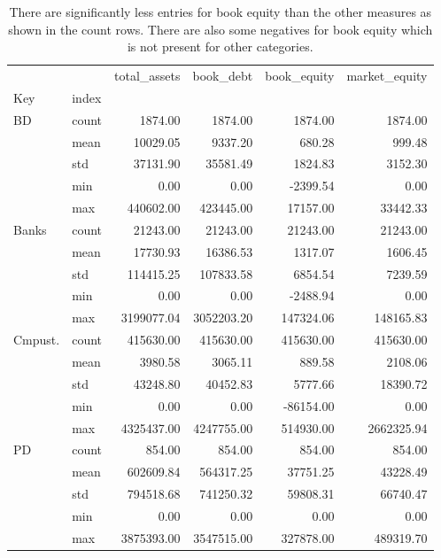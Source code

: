 \begin{table}
\caption{There are significantly less entries for book equity than the other measures as shown in the count rows. There are also some negatives for book equity which is not present for other categories. }
\label{tab:Table 2.1}
\begin{tabular}{llrrrr}
\toprule
 &  & total_assets & book_debt & book_equity & market_equity \\
Key & index &  &  &  &  \\
\midrule
{BD} & count & 1874.00 & 1874.00 & 1874.00 & 1874.00 \\
 & mean & 10029.05 & 9337.20 & 680.28 & 999.48 \\
 & std & 37131.90 & 35581.49 & 1824.83 & 3152.30 \\
 & min & 0.00 & 0.00 & -2399.54 & 0.00 \\
 & max & 440602.00 & 423445.00 & 17157.00 & 33442.33 \\
\cline{1-6}
{Banks} & count & 21243.00 & 21243.00 & 21243.00 & 21243.00 \\
 & mean & 17730.93 & 16386.53 & 1317.07 & 1606.45 \\
 & std & 114415.25 & 107833.58 & 6854.54 & 7239.59 \\
 & min & 0.00 & 0.00 & -2488.94 & 0.00 \\
 & max & 3199077.04 & 3052203.20 & 147324.06 & 148165.83 \\
\cline{1-6}
{Cmpust.} & count & 415630.00 & 415630.00 & 415630.00 & 415630.00 \\
 & mean & 3980.58 & 3065.11 & 889.58 & 2108.06 \\
 & std & 43248.80 & 40452.83 & 5777.66 & 18390.72 \\
 & min & 0.00 & 0.00 & -86154.00 & 0.00 \\
 & max & 4325437.00 & 4247755.00 & 514930.00 & 2662325.94 \\
\cline{1-6}
{PD} & count & 854.00 & 854.00 & 854.00 & 854.00 \\
 & mean & 602609.84 & 564317.25 & 37751.25 & 43228.49 \\
 & std & 794518.68 & 741250.32 & 59808.31 & 66740.47 \\
 & min & 0.00 & 0.00 & 0.00 & 0.00 \\
 & max & 3875393.00 & 3547515.00 & 327878.00 & 489319.70 \\
\cline{1-6}
\bottomrule
\end{tabular}
\end{table}
